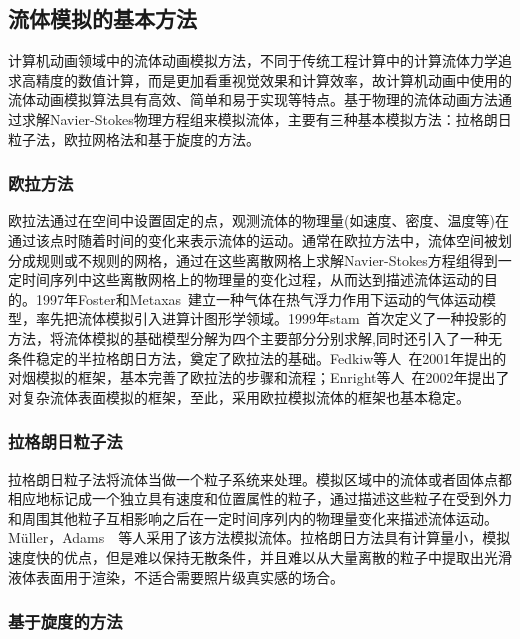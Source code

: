 \subsection{流体模拟的基本方法}
\label{sec:basicMethod}
 计算机动画领域中的流体动画模拟方法，不同于传统工程计算中的计算流体力学追求高精度的数值计算，而是更加看重视觉效果和计算效率，故计算机动画中使用的流体动画模拟算法具有高效、简单和易于实现等特点。基于物理的流体动画方法通过求解Navier-Stokes物理方程组来模拟流体，主要有三种基本模拟方法：拉格朗日粒子法，欧拉网格法和基于旋度的方法。
 
 \subsubsection{欧拉方法}
\label{sec:Euler}

欧拉法通过在空间中设置固定的点，观测流体的物理量(如速度、密度、温度等)在通过该点时随着时间的变化来表示流体的运动。通常在欧拉方法中，流体空间被划分成规则或不规则的网格，通过在这些离散网格上求解Navier-Stokes方程组得到一定时间序列中这些离散网格上的物理量的变化过程，从而达到描述流体运动的目的。1997年Foster和Metaxas~\cite{foster1997modeling}建立一种气体在热气浮力作用下运动的气体运动模型，率先把流体模拟引入进算计图形学领域。1999年stam~\cite{stam1999stable}首次定义了一种投影的方法，将流体模拟的基础模型分解为四个主要部分分别求解,同时还引入了一种无条件稳定的半拉格朗日方法，奠定了欧拉法的基础。Fedkiw等人~\cite{fedkiw2001visual}在2001年提出的对烟模拟的框架，基本完善了欧拉法的步骤和流程；Enright等人~\cite{enright2002animation}在2002年提出了对复杂流体表面模拟的框架，至此，采用欧拉模拟流体的框架也基本稳定。

 \subsubsection{拉格朗日粒子法}
\label{sec:Lagrangian}

拉格朗日粒子法将流体当做一个粒子系统来处理。模拟区域中的流体或者固体点都相应地标记成一个独立具有速度和位置属性的粒子，通过描述这些粒子在受到外力和周围其他粒子互相影响之后在一定时间序列内的物理量变化来描述流体运动。M{\"u}ller，Adams~\cite{muller2003particle}~\cite{adams2007adaptively}等人采用了该方法模拟流体。拉格朗日方法具有计算量小，模拟速度快的优点，但是难以保持无散条件，并且难以从大量离散的粒子中提取出光滑液体表面用于渲染，不适合需要照片级真实感的场合。

 \subsubsection{基于旋度的方法}
\label{sec:Vortex}

